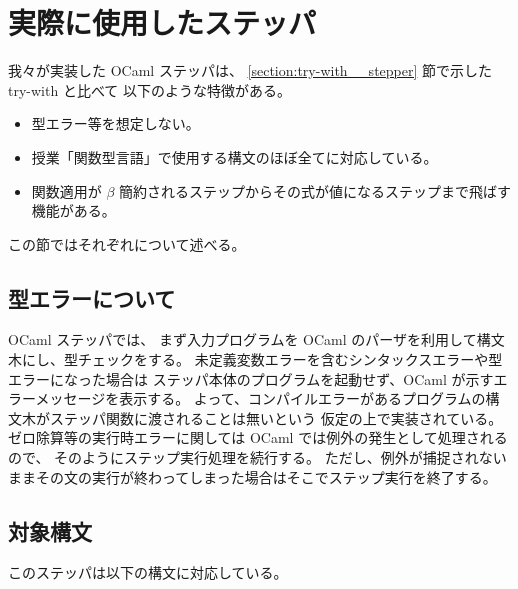 \section{実際に使用したステッパ}
\label{section:experiment__stepper}

我々が実装した OCaml ステッパは、
\ref{section:try-with__stepper} 節で示した try-with と比べて
以下のような特徴がある。

\begin{itemize}
\item 型エラー等を想定しない。
\item 授業「関数型言語」で使用する構文のほぼ全てに対応している。
\item 関数適用が $\beta$ 簡約されるステップからその式が値になるステップまで飛ばす機能がある。
\end{itemize}

この節ではそれぞれについて述べる。

\subsection{型エラーについて}
\label{subsection:stepper__type}

OCaml ステッパでは、
まず入力プログラムを OCaml のパーザを利用して構文木にし、型チェックをする。
未定義変数エラーを含むシンタックスエラーや型エラーになった場合は
ステッパ本体のプログラムを起動せず、OCaml が示すエラーメッセージを表示する。
よって、コンパイルエラーがあるプログラムの構文木がステッパ関数に渡されることは無いという
仮定の上で実装されている。
ゼロ除算等の実行時エラーに関しては OCaml では例外の発生として処理されるので、
そのようにステップ実行処理を続行する。
ただし、例外が捕捉されないままその文の実行が終わってしまった場合はそこでステップ実行を終了する。

\subsection{対象構文}
\label{subsection:stepper__syntax}
このステッパは以下の構文に対応している。

